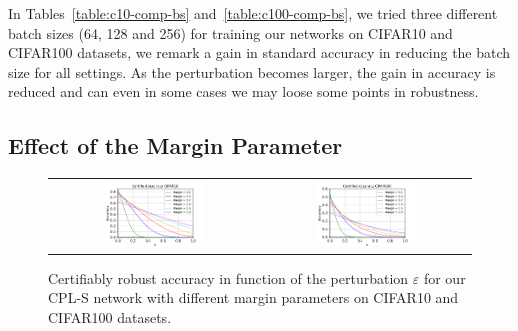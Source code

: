In Tables~\ref{table:c10-comp-bs} and~\ref{table:c100-comp-bs}, we tried three different batch sizes (64, 128 and 256) for training our networks on CIFAR10 and CIFAR100 datasets, we remark a gain in standard accuracy in reducing the batch size for all settings. As the perturbation becomes larger, the gain in accuracy is reduced and can even in some cases we may loose some points in robustness.

\subsection{Effect of the Margin Parameter}

\begin{figure}[h]
    \centering
    \begin{tabular}{cc}
    \includegraphics[width=0.49\textwidth]{sections/4_certification/images/cert_acc_margin_eps_c10.pdf}&\includegraphics[width=0.49\textwidth]{sections/4_certification/images/cert_acc_margin_eps_c100.pdf}
    \end{tabular}
    \caption{Certifiably robust accuracy in function of the perturbation $\varepsilon$ for our CPL-S  network with different margin parameters on CIFAR10 and CIFAR100 datasets.}
    \label{fig:cert-acc-margin}
\end{figure}


